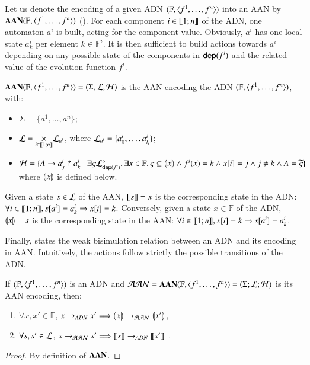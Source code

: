 Let us denote the encoding of a given ADN $\DNdef$ into an AAN by $\toPH\DNdef$ ().
For each component $i\in\segm{1}{n}$ of the ADN,
one automaton $a^i$ is built, acting for the component value.
Obviously, $a^i$ has one local state $a^i_k$ per element $k \in \mathbb F^i$.
It is then sufficient to build actions towards $a^i$
depending on any possible state of the components in $\DNdep(f^i)$
and the related value of the evolution function $f^i$.

\begin{definition}
\label{def:DN2PH}
  $\toPH\DNdef=(\Sigma,\PHl,\Hits)$ is the AAN encoding the ADN $\DNdef$, with:
  \begin{itemize}
    \item $\Sigma = \{ a^1, \dots, a^n \}$;
    
    \item $\PHl=\underset{i\in\segm{1}{n}}{\times} \PHl_{a^i}$, where
      $\PHl_{a^i}=\{a^i_0, \dots, a^i_{l_i}\}$;
    
    \item $\PHh = \{ \PHfrappe{A}{a^i_j}{a^i_k} \mid
      \exists \varsigma \PHsubl[\PHl]_{\DNdep(f^i)}, \exists x \in \mathbb{F},
      \varsigma \subseteq \encode{x} \wedge
      f^i(x) = k \wedge \PHget{x}{i} = j \wedge j \neq k \wedge
      A = \toset{\varsigma} \}$ where $\encode{x}$ is defined below.
  \end{itemize}
  Given a state $s \in \PHl$ of the AAN,
  $\decode s=x$ is the corresponding state in the ADN:
  $\forall i\in\segm{1}{n}, \get{s}{a^i}=a^i_k \Rightarrow \get{x}{i}=k$.
  Conversely, given a state $x\in \mathbb F$ of the ADN, 
  $\encode x=s$ is the corresponding state in the AAN:
  $\forall i\in\segm{1}{n}, \get{x}{i}=k \Rightarrow \get{s}{a^i}=a^i_k$.
\end{definition}

Finally,
 states the weak bisimulation relation between an ADN and its encoding in AAN.
Intuitively, the actions follow strictly the possible transitions of the ADN.

\begin{theorem}[$\DNdef \approx \toPH\DNdef$]
\label{th:bisimDN}
  If $\DNdef$ is an ADN
  and $\PH = \toPH\DNdef = (\PHs; \PHl; \PHa)$ is its AAN encoding, then:
  \begin{enumerate}
    \item \label{adn2ph} $\forall x,x'\in\mathbb F$,
      $x\DNtrans x' \Longrightarrow \encode x \PHPtrans \encode{x'}$,
    \item \label{ph2adn} $\forall s,s'\in \PHl$,
      $s\PHPtrans s' \Longrightarrow \decode s \DNtrans
      \decode{s'}\enspace.$
  \end{enumerate}
\end{theorem}

\begin{proof}
  By definition of $\toPH$.
\end{proof}
